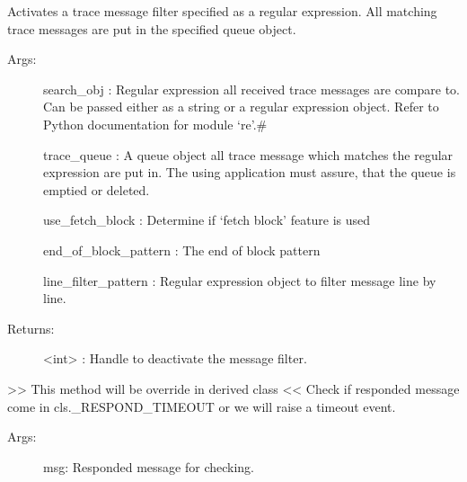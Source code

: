 \documentclass[letterpaper,10pt,english]{sphinxmanual}
\begin{document}
\begin{fulllineitems}
\begin{fulllineitems}
\label{\detokenize{QConnectBase:QConnectBase.connection_base.ConnectionBase.activate_trace_queue}}
\sphinxAtStartPar
Activates a trace message filter specified as a regular expression. All matching trace messages are put in the specified queue object.
\begin{description}
\item[{Args:}] \leavevmode
\sphinxAtStartPar
search\_obj :  Regular expression all received trace messages are compare to.                        Can be passed either as a string or a regular expression object. Refer to Python documentation for module ‘re’.\#

\sphinxAtStartPar
trace\_queue : A queue object all trace message which matches the regular expression are put in.                        The using application must assure, that the queue is emptied or deleted.

\sphinxAtStartPar
use\_fetch\_block : Determine if ‘fetch block’ feature is used

\sphinxAtStartPar
end\_of\_block\_pattern : The end of block pattern

\sphinxAtStartPar
line\_filter\_pattern : Regular expression object to filter message line by line.

\item[{Returns:}] \leavevmode
\sphinxAtStartPar
\textless{}int\textgreater{} : Handle to deactivate the message filter.

\end{description}

\end{fulllineitems}


\begin{fulllineitems}
\label{\detokenize{QConnectBase:QConnectBase.connection_base.ConnectionBase.check_timeout}}
\sphinxAtStartPar
\textgreater{}\textgreater{} This method will be override in derived class \textless{}\textless{}
Check if responded message come in cls.\_RESPOND\_TIMEOUT or we will raise a timeout event.
\begin{description}
\item[{Args:}] \leavevmode
\sphinxAtStartPar
msg: Responded message for checking.


\end{description}
\end{fulllineitems}
\end{fulllineitems}
\end{document}
